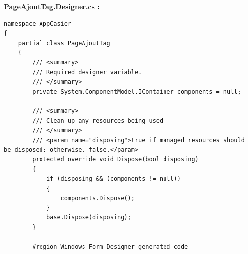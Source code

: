 \documentclass[main.tex]{subfiles}
\begin{document}
\textbf{PageAjoutTag.Designer.cs :}

\begin{lstlisting}
namespace AppCasier
{
    partial class PageAjoutTag
    {
        /// <summary>
        /// Required designer variable.
        /// </summary>
        private System.ComponentModel.IContainer components = null;

        /// <summary>
        /// Clean up any resources being used.
        /// </summary>
        /// <param name="disposing">true if managed resources should be disposed; otherwise, false.</param>
        protected override void Dispose(bool disposing)
        {
            if (disposing && (components != null))
            {
                components.Dispose();
            }
            base.Dispose(disposing);
        }

        #region Windows Form Designer generated code


\end{lstlisting}
\end{document}
